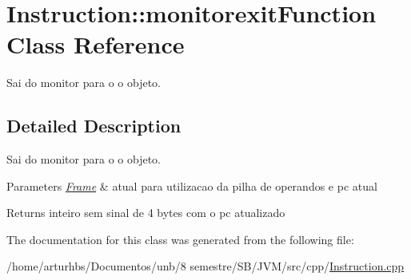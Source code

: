 \hypertarget{classInstruction_1_1monitorexitFunction}{}\section{Instruction\+:\+:monitorexit\+Function Class Reference}
\label{classInstruction_1_1monitorexitFunction}


Sai do monitor para o o objeto.  




\subsection{Detailed Description}
Sai do monitor para o o objeto. 


\begin{DoxyParams}{Parameters}
{\em \hyperlink{classFrame}{Frame}} & atual para utilizacao da pilha de operandos e pc atual \\
\hline
\end{DoxyParams}
\begin{DoxyReturn}{Returns}
inteiro sem sinal de 4 bytes com o pc atualizado 
\end{DoxyReturn}


The documentation for this class was generated from the following file\+:\begin{DoxyCompactItemize}
\item 
/home/arturhbs/\+Documentos/unb/8 semestre/\+S\+B/\+J\+V\+M/src/cpp/\hyperlink{Instruction_8cpp}{Instruction.\+cpp}\end{DoxyCompactItemize}
